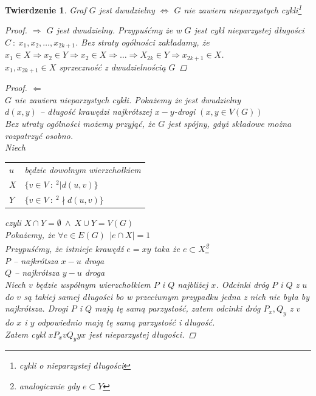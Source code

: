 \documentclass[12pt,a4paper]{article}
\newtheorem{tw}{Twierdzenie}
\theoremstyle{definition}
\newcommand{\egz}{\marginpar{\color{red} EGZAMIN}} %
\begin{document}
\begin{tw}\egz
Graf $G$ jest dwudzielny $\Leftrightarrow$ $G$ nie zawiera nieparzystych cykli\footnote{cykli o nieparzystej długości}
\begin{proof}$\Rightarrow$
$G$ jest dwudzielny. Przypuśćmy że w $G$ jest cykl nieparzystej długości $C ~:~ x_1,x_2,\dots, x_{2k+1}$. Bez straty ogólności zakładamy, że $x_1 \in X \Rightarrow x_2\in Y \Rightarrow x_2\in X \Rightarrow \dots \Rightarrow X_{2k}\in Y \Rightarrow x_{2k+1}\in X$. \\
$x_1,x_{2k+1}\in X$ sprzeczność z dwudzielnością $G$ 
\end{proof}
\begin{proof}$\Leftarrow$\\
$G$ nie zawiera nieparzystych cykli. Pokażemy że jest dwudzielny\\
$d(x,y)$ -- długość krawędzi najkrótszej $x-y$-drogi $(x,y \in V(G))$\\
Bez utraty ogólności możemy przyjąć, że $G$ jest spójny, gdyż składowe można rozpatrzyć osobno.\\
Niech
\begin{tabular}{l l}
	$u$ & będzie dowolnym wierzchołkiem\\
	$X$ & $\{ v\in V ~:~ ^2|d(u,v)\}$\\
	$Y$ & $\{ v\in V ~:~ ^2\nmid d(u,v)\}$
\end{tabular}
czyli $X\cap Y = \emptyset ~\wedge~ X\cup Y = V(G)$\\
Pokażemy, że $\forall e\in E(G) ~~ |e\cap X| = 1$\\
Przypuśćmy, że istnieje krawędź $e = xy$ taka  że $e\subset X$\footnote{analogicznie gdy $e\subset Y$}\\
$P$ -- najkrótsza $x-u$ droga\\
$Q$ -- najkrótsza $y-u$ droga\\
Niech $v$ będzie wspólnym wierzchołkiem $P$ i $Q$ najbliżej $x$. Odcinki dróg $P$ i $Q$ z $u$ do $v$ są takiej samej długości bo w przeciwnym przypadku jedna z nich nie była by najkrótsza. Drogi $P$ i $Q$ mają tę samą parzystość, zatem odcinki dróg $P_x, Q_y$ z $v$ do $x$ i $y$ odpowiednio mają tę samą parzystość i długość. \\Zatem cykl $xP_xvQ_yyx$ jest nieparzystej długości.
\end{proof}
\end{tw}
\end{document}
